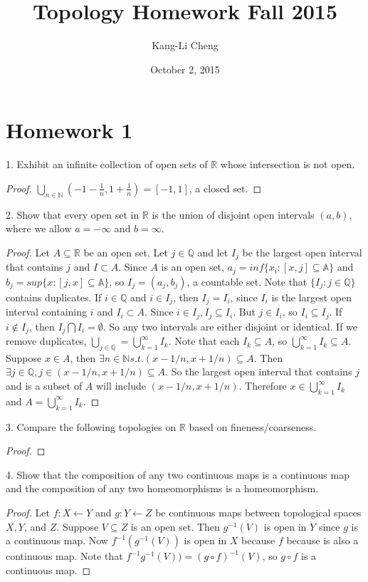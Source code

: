 \documentclass{amsart}
\title{Topology Homework Fall 2015}
\author{Kang-Li Cheng}
\date{October 2, 2015}
\begin{document}
\maketitle

\section{Homework 1}
1. Exhibit an infinite collection of open sets of $\mathbb{R}$ whose intersection is not open. 
\begin{proof}
$\bigcup_{n\in\mathbb{N}}(-1-\frac{1}{n}, 1+\frac{1}{n})=[-1, 1]$, a closed set. 
\end{proof}

2. Show that every open set in $\mathbb{R}$ is the union of disjoint open intervals $(a, b)$, where we allow $a=-\infty$ and $b=\infty$. 
\begin{proof}
Let $A\subseteq\mathbb{R}$ be an open set. Let $j\in\mathbb{Q}$ and let $I_j$ be the largest open interval that contains $j$ and $I\subset A$. Since $A$ is an open set, $a_j=inf\{x_i:[x, j]\subseteq\mathbb{A}\}$ and $b_j=sup\{x:[j,x]\subseteq\mathbb{A}\}$, so $I_j=(a_j, b_j)$, a countable set. 
Note that $\{I_j:j\in\mathbb{Q}\}$ contains duplicates. If $i\in\mathbb{Q}$ and $i\in I_j$, then $I_j=I_i$, since $I_i$ is the largest open interval containing $i$ and $I_i\subset A$. Since $i\in I_j, I_j\subseteq I_i$. But $j\in I_i$, so $I_i\subseteq I_j$. If $i\notin I_j$, then $I_j\bigcap I_i=\emptyset$. So any two intervals are either disjoint or identical. If we remove duplicates, $\bigcup_{j\in\mathbb{Q}}=\bigcup_{k=1}^\infty I_k$. Note that each $I_k\subseteq A$, so $\bigcup_{k=1}^\infty I_k\subseteq A$. Suppose $x\in A$, then $\exists n\in\mathbb{N} s.t. (x-1/n, x+1/n)\subseteq A$. Then $\exists j\in\mathbb{Q}, j\in(x-1/n, x+1/n)\subseteq A$. So the largest open interval that contains $j$ and is a subset of $A$ will include $(x-1/n, x+1/n)$. Therefore $x\in\bigcup_{k=1}^\infty I_k$ and $A= \bigcup_{k=1}^\infty I_k$. 
\end{proof}
3. Compare the following topologies on $\mathbb{R}$ based on fineness/coarseness.
\begin{proof}
\end{proof}
4. Show that the composition of any two continuous maps is a continuous map and the composition of any two homeomorphisms is a homeomorphism.
\begin{proof}
Let $f:X\leftarrow Y$ and $g:Y\leftarrow Z$ be continuous maps between topological spaces $X, Y$, and $Z$. Suppose $V\subseteq Z$ is an open set. Then $g^{-1}(V)$ is open in $Y$ since $g$ is a continuous map. Now $f^{-1}(g^{-1}(V))$ is open in $X$ because $f$ because is also a continuous map. Note that $f^{-1}g^{-1}(V))=(g\circ f)^{-1}(V)$, so $g\circ f$ is a continuous map. 



\end{proof}
\end{document}
